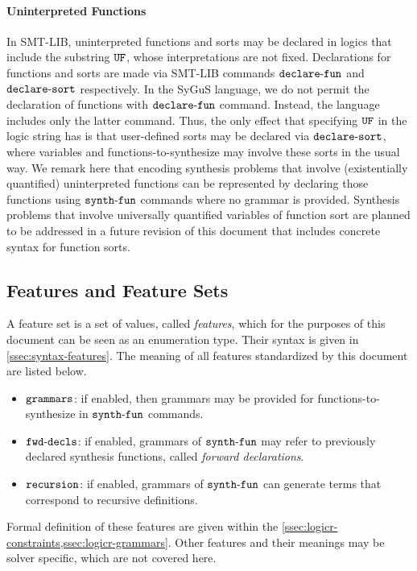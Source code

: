\documentclass[english,a4paper,10pt]{article}
\begin{document}
\paragraph{Uninterpreted Functions}
In SMT-LIB, uninterpreted functions and sorts may be declared in
logics that include the substring ${\tt UF}$,
whose interpretations are not fixed.
Declarations for functions and sorts are made via SMT-LIB commands 
${\tt declare\mbox{-}fun}$ and ${\tt declare\mbox{-}sort}$ respectively.
In the SyGuS language, we do not permit
the declaration of functions with ${\tt declare\mbox{-}fun}$ command.
Instead, the language includes only the latter command.
Thus, the only effect that specifying ${\tt UF}$ in the logic string has is
that user-defined sorts may be declared via ${\tt declare\mbox{-}sort}$, where
variables and functions-to-synthesize may involve these sorts in the usual way.
We remark here that
encoding synthesis problems 
that involve (existentially quantified)
uninterpreted functions
can be represented by declaring those functions
using ${\tt synth\mbox{-}fun}$ commands where no grammar is provided.
Synthesis problems that involve universally quantified variables of function sort
are planned to be addressed in a future revision of this document
that includes concrete syntax for function sorts.

\subsection{Features and Feature Sets}
\label{ssec:feature-sets}

A feature set is a set of values, called \emph{features},
which for the purposes of this document can be seen as an enumeration type.
Their syntax is given in \cref{ssec:syntax-features}.
The meaning of all features standardized by this document are listed below.
\begin{itemize}
\item ${\tt grammars}$: if enabled, 
then grammars may be provided for functions-to-synthesize 
in ${\tt synth\mbox{-}fun}$ commands.
\item ${\tt fwd\mbox{-}decls}$: if enabled,
grammars of ${\tt synth\mbox{-}fun}$ may refer to previously declared synthesis functions,
called \emph{forward declarations}.
\item ${\tt recursion}$: if enabled,
grammars of ${\tt synth\mbox{-}fun}$ can generate terms that correspond to recursive definitions.
\end{itemize}
Formal definition of these features are given within the 
\cref{ssec:logicr-constraints,ssec:logicr-grammars}.
Other features and their meanings may be solver specific, 
which are not covered here.
\end{document}

